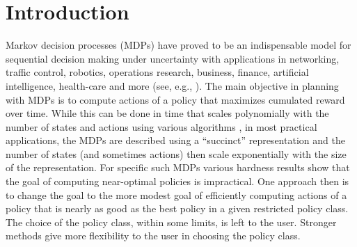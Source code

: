 \section{Introduction}
Markov decision processes (MDPs) have proved to be an indispensable model for sequential decision making under uncertainty with applications in networking, traffic control, robotics, operations research, business, finance, artificial intelligence, health-care and more (see, e.g., \cite{BauRie:11,Puter,FeiSh02:MDPHandbook,Abuetal15:MDPWireless,White93:Apps,QiWu07,SiBu10:MDPinAI,BouDi17:MDPPractice}).
The main objective in planning with MDPs is to compute actions of a policy that maximizes cumulated reward over time.
While this can be done in time that scales polynomially with the number of states and actions using various algorithms
\cite{BlonTsi:00Complexity}, in most practical applications, 
the MDPs are described using a ``succinct'' representation and the number of states (and sometimes actions) then scale exponentially with the size of the representation. For specific such MDPs various hardness results show that the
goal of computing near-optimal policies is impractical.
One approach then is to change the goal to the more modest goal of efficiently computing actions of a policy that 
is nearly as good as the best policy in a given restricted policy class.
The choice of the policy class, within some limits, is left to the user. 
Stronger methods give more flexibility to the user in choosing the policy class.


